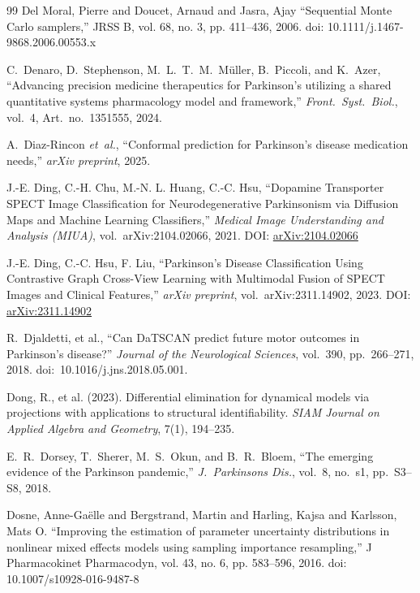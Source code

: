 \begin{thebibliography}{99}
 Del Moral, Pierre and Doucet, Arnaud and Jasra, Ajay ``Sequential Monte Carlo samplers,'' JRSS B, vol. 68, no. 3, pp. 411--436, 2006. doi: 10.1111/j.1467-9868.2006.00553.x

C.~Denaro, D.~Stephenson, M.~L.~T.~M.~M{\"u}ller, B.~Piccoli, and K.~Azer, ``Advancing precision medicine therapeutics for Parkinson's utilizing a shared quantitative systems pharmacology model and framework,'' \textit{Front.\ Syst.\ Biol.}, vol.~4, Art.\ no.~1351555, 2024.

A.~Diaz-Rincon \textit{et~al.}, ``Conformal prediction for Parkinson's disease medication needs,'' \textit{arXiv preprint}, 2025.

J.-E. Ding, C.-H. Chu, M.-N. L. Huang, C.-C. Hsu,
``Dopamine Transporter SPECT Image Classification for Neurodegenerative Parkinsonism via Diffusion Maps and Machine Learning Classifiers,''
\textit{Medical Image Understanding and Analysis (MIUA)}, vol.~arXiv:2104.02066, 2021. DOI: \href{https://arxiv.org/abs/2104.02066}{arXiv:2104.02066}

J.-E. Ding, C.-C. Hsu, F. Liu,
``Parkinson's Disease Classification Using Contrastive Graph Cross-View Learning with Multimodal Fusion of SPECT Images and Clinical Features,''
\textit{arXiv preprint}, vol.~arXiv:2311.14902, 2023. DOI: \href{https://arxiv.org/abs/2311.14902}{arXiv:2311.14902}

R.~Djaldetti, et al., ``Can DaTSCAN predict future motor outcomes in Parkinson's disease?'' \textit{Journal of the Neurological Sciences}, vol.~390, pp.~266--271, 2018. doi:~10.1016/j.jns.2018.05.001.

Dong, R., et al. (2023).
\newblock Differential elimination for dynamical models via projections with applications to structural identifiability.
\newblock \emph{SIAM Journal on Applied Algebra and Geometry}, 7(1), 194--235.

E.~R.~Dorsey, T.~Sherer, M.~S.~Okun, and B.~R.~Bloem, ``The emerging evidence of the Parkinson pandemic,'' \textit{J.\ Parkinsons Dis.}, vol.~8, no.~s1, pp.~S3--S8, 2018.

 Dosne, Anne-Ga\"elle and Bergstrand, Martin and Harling, Kajsa and Karlsson, Mats O. ``Improving the estimation of parameter uncertainty distributions in nonlinear mixed effects models using sampling importance resampling,'' J Pharmacokinet Pharmacodyn, vol. 43, no. 6, pp. 583--596, 2016. doi: 10.1007/s10928-016-9487-8


\end{thebibliography}
